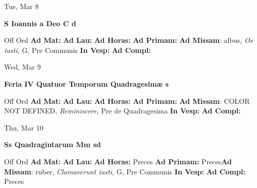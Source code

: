 \documentclass[10pt]{memoir}
\begin{document}
\begin{center}
\begin{minipage}{3.5in}
\vspace{2em}
\begin{center}Tue, Mar 8
\end{center}
\textbf{ \large S Ioannis a Deo C
\textnormal{\normalsize d}}

\begin{justify}Off Ord
\textbf{Ad Mat: }
\textbf{Ad Lau: }
\textbf{Ad Horas: }
\textbf{Ad Primam: }\textbf{Ad Missam}: albus, \textit{Os iusti,} G, Pre Communis
\textbf{In Vesp: }
\textbf{Ad Compl: }
\end{justify}
\end{minipage}
\end{center}

\begin{center}
\begin{minipage}{3.5in}
\vspace{2em}
\begin{center}Wed, Mar 9
\end{center}
\textbf{ \large Feria IV Quatuor Temporum Quadragesimæ
\textnormal{\normalsize s}}

\begin{justify}Off Ord
\textbf{Ad Mat: }
\textbf{Ad Lau: }
\textbf{Ad Horas: }
\textbf{Ad Primam: }\textbf{Ad Missam}: COLOR NOT DEFINED, \textit{Reminiscere,} Pre de Quadragesima
\textbf{In Vesp: }
\textbf{Ad Compl: }
\end{justify}
\end{minipage}
\end{center}

\begin{center}
\begin{minipage}{3.5in}
\vspace{2em}
\begin{center}Thu, Mar 10
\end{center}
\textbf{ \large Ss Quadragintarum Mm
\textnormal{\normalsize sd}}

\begin{justify}Off Ord
\textbf{Ad Mat: }
\textbf{Ad Lau: }
\textbf{Ad Horas: }Preces
\textbf{Ad Primam: }Preces\textbf{Ad Missam}: ruber, \textit{Clamaverunt iusti,} G, Pre Communis
\textbf{In Vesp: }
\textbf{Ad Compl: }Preces
\end{justify}
\end{minipage}
\end{center}
\end{document}
